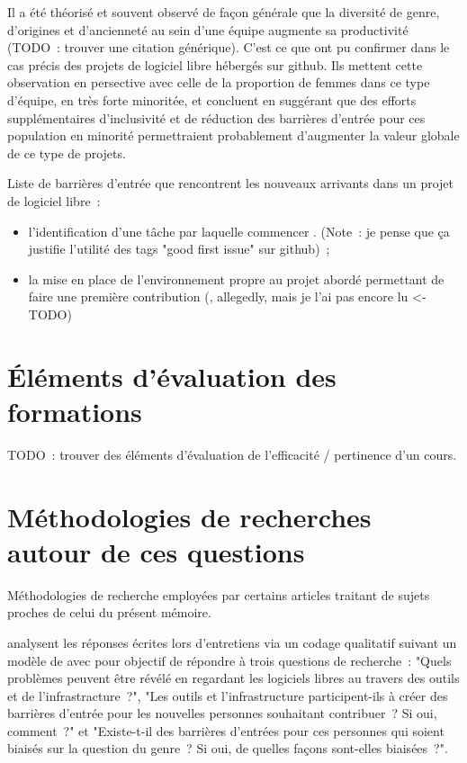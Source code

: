 Il a été théorisé et souvent observé de façon générale que la diversité de genre, d'origines et d'ancienneté
au sein d'une équipe augmente sa productivité (TODO : trouver une citation générique). C'est ce que
 ont pu confirmer dans le cas précis des projets de logiciel libre hébergés sur
\gls{github}. Ils mettent cette observation en persective avec celle de la proportion de
femmes dans ce type d'équipe, en très forte minoritée, et concluent en suggérant que des efforts
supplémentaires d'inclusivité et de réduction des barrières d'entrée pour ces population en minorité
permettraient probablement d'augmenter la valeur globale de ce type de projets.

Liste de barrières d'entrée que rencontrent les nouveaux arrivants dans un projet de logiciel libre :

\begin{itemize}
    \item l'identification d'une tâche par laquelle commencer . (Note : je
        pense que ça justifie l'utilité des tags "good first issue" sur \gls{github}) ;
    \item la mise en place de l'environnement propre au projet abordé permettant de faire une première
        contribution (, allegedly, mais je l'ai pas encore lu <- TODO)
\end{itemize}

\section{Éléments d'évaluation des formations}

TODO : trouver des éléments d'évaluation de l'efficacité / pertinence d'un cours.

\section{Méthodologies de recherches autour de ces questions}

Méthodologies de recherche employées par certains articles traitant de sujets proches de celui du présent
mémoire.

\textcite[p.~1006]{barriers-2018} analysent les réponses écrites lors d'entretiens via un codage
qualitatif suivant un modèle de  avec pour objectif de répondre à trois questions
de recherche : "Quels problèmes peuvent être révélé en regardant les logiciels libres au travers des outils et
de l'infrastracture ?", "Les outils et l'infrastructure participent-ils à créer des barrières d'entrée pour
les nouvelles personnes souhaitant contribuer ? Si oui, comment ?" et "Existe-t-il des barrières d'entrées
pour ces personnes qui soient biaisés sur la question du genre ? Si oui, de quelles façons sont-elles
biaisées ?".


